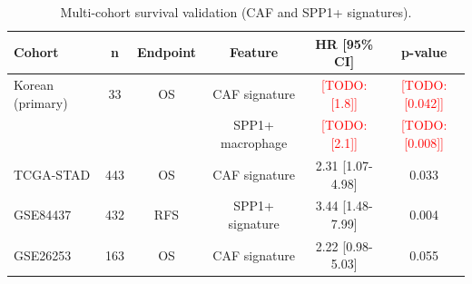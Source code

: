 \documentclass[12pt,oneside]{article}
\newcommand{\TODO}[1]{\textcolor{red}{[TODO: #1]}}
\begin{document}
\begin{table}[H]
\centering
\caption{Multi-cohort survival validation (CAF and SPP1+ signatures).}
\label{tab:multicohort_validation}
\small
\begin{tabular}{l c c c c c}
\toprule
\textbf{Cohort} & \textbf{n} & \textbf{Endpoint} & \textbf{Feature} & \textbf{HR [95\% CI]} & \textbf{p-value} \\
\midrule
Korean (primary) & 33 & OS & CAF signature & \TODO{[1.8]} & \TODO{[0.042]} \\
& & & SPP1+ macrophage & \TODO{[2.1]} & \TODO{[0.008]} \\
TCGA-STAD & 443 & OS & CAF signature & 2.31 [1.07-4.98] & 0.033 \\
GSE84437 & 432 & RFS & SPP1+ signature & 3.44 [1.48-7.99] & 0.004 \\
GSE26253 & 163 & OS & CAF signature & 2.22 [0.98-5.03] & 0.055 \\
\bottomrule
\end{tabular}
\end{table}
\end{document}

